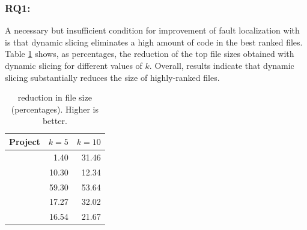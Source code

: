 \documentclass{article}
\begin{document}






\subsubsection{\label{rq:1}RQ1: \textit{\rqone}}

A necessary but insufficient condition for improvement of fault
localization with \comb{} is that dynamic slicing eliminates a high
amount of code in the best ranked files. Table \ref{tab:red} shows, as
percentages, the reduction of the top file sizes
obtained with dynamic slicing for different values of
$k$. Overall, results indicate
that dynamic slicing substantially reduces the size of highly-ranked
files.



\begin{table}[H]
  \small
	\centering
	\setlength{\tabcolsep}{4pt}
	\begin{tabular}{lrr}
		\toprule
		Project             &  \multicolumn{1}{c}{$k=5$} & \multicolumn{1}{c}{$k=10$} \\ %
		\midrule

        \lang{}            & 1.40 & 31.46\\
        \cmath{}           & 10.30 & 12.34\\
		\chart{}			& 59.30 & 53.64 \\
        \jtime{}            & 17.27 & 32.02\\
        \mockito{}          & 16.54 & 21.67\\

		\bottomrule
	\end{tabular}
	\caption {\ds{} reduction in file size (percentages). Higher is better.}
	\label{tab:red}
\end{table}
\normalsize
\end{document}
